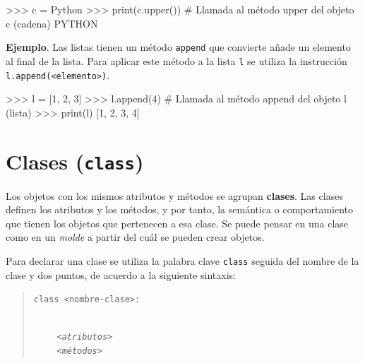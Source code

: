 \documentclass[
  spanish,
  a4paper,
]{scrreport}
\newenvironment{Shaded}{\begin{snugshade}}{\end{snugshade}}
\newcommand{\BuiltInTok}[1]{\textcolor[rgb]{0.00,0.23,0.31}{#1}}
\newcommand{\CommentTok}[1]{\textcolor[rgb]{0.37,0.37,0.37}{#1}}
\newcommand{\DecValTok}[1]{\textcolor[rgb]{0.68,0.00,0.00}{#1}}
\newcommand{\NormalTok}[1]{\textcolor[rgb]{0.00,0.23,0.31}{#1}}
\newcommand{\OperatorTok}[1]{\textcolor[rgb]{0.37,0.37,0.37}{#1}}
\newcommand{\StringTok}[1]{\textcolor[rgb]{0.13,0.47,0.30}{#1}}
\begin{document}
\begin{Shaded}
\begin{Highlighting}[]
\OperatorTok{\textgreater{}\textgreater{}\textgreater{}}\NormalTok{ c }\OperatorTok{=} \StringTok{\textquotesingle{}Python\textquotesingle{}}
\OperatorTok{\textgreater{}\textgreater{}\textgreater{}} \BuiltInTok{print}\NormalTok{(c.upper())    }\CommentTok{\# Llamada al método upper del objeto c (cadena)}
\NormalTok{PYTHON}
\end{Highlighting}
\end{Shaded}

\textbf{Ejemplo}. Las listas tienen un método \texttt{append} que
convierte añade un elemento al final de la lista. Para aplicar este
método a la lista \texttt{l} se utiliza la instrucción
\texttt{l.append(\textless{}elemento\textgreater{})}.

\begin{Shaded}
\begin{Highlighting}[]
\OperatorTok{\textgreater{}\textgreater{}\textgreater{}}\NormalTok{ l }\OperatorTok{=}\NormalTok{  [}\DecValTok{1}\NormalTok{, }\DecValTok{2}\NormalTok{, }\DecValTok{3}\NormalTok{]     }
\OperatorTok{\textgreater{}\textgreater{}\textgreater{}}\NormalTok{ l.append(}\DecValTok{4}\NormalTok{)         }\CommentTok{\# Llamada al método append del objeto l (lista)}
\OperatorTok{\textgreater{}\textgreater{}\textgreater{}} \BuiltInTok{print}\NormalTok{(l)}
\NormalTok{[}\DecValTok{1}\NormalTok{, }\DecValTok{2}\NormalTok{, }\DecValTok{3}\NormalTok{, }\DecValTok{4}\NormalTok{]}
\end{Highlighting}
\end{Shaded}

\section{\texorpdfstring{Clases
(\texttt{class})}{Clases (class)}}\label{clases-class}

Los objetos con los mismos atributos y métodos se agrupan
\textbf{clases}. Las clases definen los atributos y los métodos, y por
tanto, la semántica o comportamiento que tienen los objetos que
pertenecen a esa clase. Se puede pensar en una clase como en un
\emph{molde} a partir del cuál se pueden crear objetos.

Para declarar una clase se utiliza la palabra clave \texttt{class}
seguida del nombre de la clase y dos puntos, de acuerdo a la siguiente
sintaxis:

\begin{quote}
\texttt{class\ \textless{}nombre-clase\textgreater{}:}\strut \\
     \emph{\texttt{\textless{}atributos\textgreater{}}}\\
     \emph{\texttt{\textless{}métodos\textgreater{}}}
\end{quote}
\end{document}
